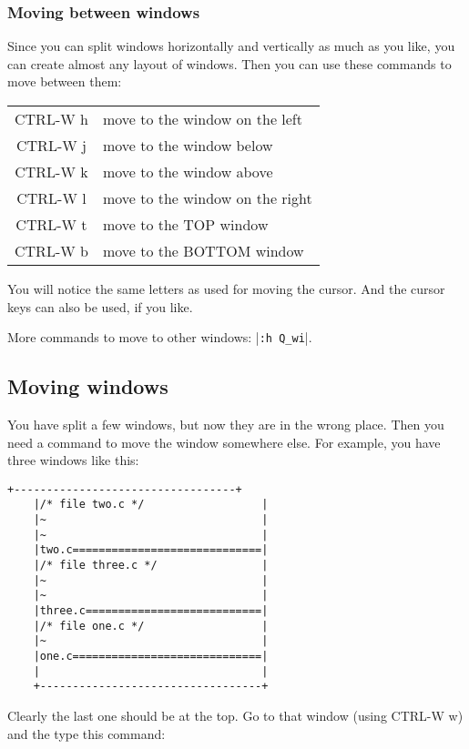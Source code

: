 \subsubsection{Moving between windows}
Since you can split windows horizontally and vertically as much as you like, you can create almost any layout of windows.
Then you can use these commands to move between them:

\begin{center}
				\begin{longtable}{c l}
				CTRL-W h & move to the window on the left\\
				CTRL-W j & move to the window below\\
				CTRL-W k & move to the window above\\
				CTRL-W l & move to the window on the right\\
				CTRL-W t & move to the TOP window\\
				CTRL-W b & move to the BOTTOM window\\
\end{longtable}
\end{center}

You will notice the same letters as used for moving the cursor.
And the cursor keys can also be used, if you like.

More commands to move to other windows: |\verb!:h Q_wi!|.
\subsection{Moving windows}
You have split a few windows, but now they are in the wrong place.
Then you need a command to move the window somewhere else.
For example, you have three windows like this:

\begin{Verbatim}[samepage=true]
    +----------------------------------+
    |/* file two.c */                  |
    |~                                 |
    |~                                 |
    |two.c=============================|
    |/* file three.c */                |
    |~                                 |
    |~                                 |
    |three.c===========================|
    |/* file one.c */                  |
    |~                                 |
    |one.c=============================|
    |                                  |
    +----------------------------------+
\end{Verbatim}

Clearly the last one should be at the top.
Go to that window (using CTRL-W w) and the type this command:

